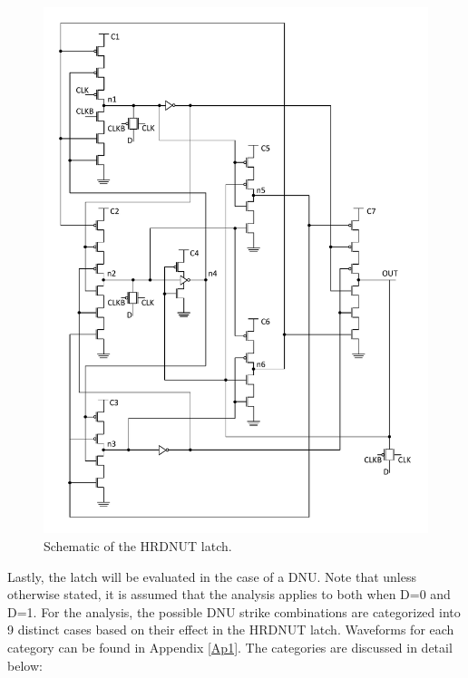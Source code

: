 \begin{figure}[!tbp]
	\centering
	\includegraphics[width=0.95\linewidth]{Figures/HRDNUT}
	\caption{Schematic of the HRDNUT latch.}
	\label{HRDNUT}
\end{figure} 

Lastly, the latch will be evaluated in the case of a DNU. Note that unless otherwise stated, it is assumed that the analysis applies to both when D=0 and D=1. For the analysis, the possible DNU strike combinations are categorized into 9 distinct cases based on their effect in the HRDNUT latch. Waveforms for each category can be found in Appendix \ref{Ap1}. The categories are discussed in detail below:

